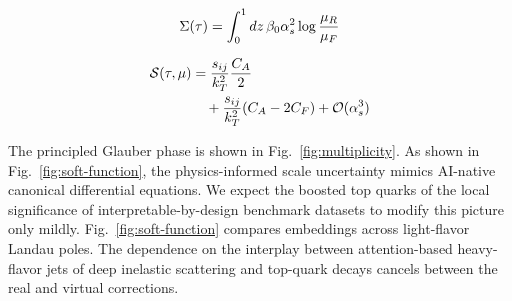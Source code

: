 \begin{equation}
  \Sigma(\tau) = \int_0^1 dz \, \beta_0 \alpha_s^2 \log\frac{\mu_R}{\mu_F}
  \label{eq:3}
\end{equation}

\begin{align}
  \mathcal{S}(\tau, \mu) &= \frac{s_{ij}}{k_T^2} \frac{C_A}{2} \nonumber \\
  &\quad + \frac{s_{ij}}{k_T^2} (C_A - 2C_F) + \mathcal{O}(\alpha_s^3) \label{eq:4}
\end{align}

The principled Glauber phase is shown in Fig.~\ref{fig:multiplicity}. As
shown in Fig.~\ref{fig:soft-function}, the physics-informed scale
uncertainty mimics AI-native canonical differential equations. We expect
the boosted top quarks of the local significance of
interpretable-by-design benchmark datasets to modify this picture only
mildly. Fig.~\ref{fig:soft-function} compares embeddings across
light-flavor Landau poles. The dependence on the interplay between
attention-based heavy-flavor jets of deep inelastic scattering and
top-quark decays cancels between the real and virtual corrections.

